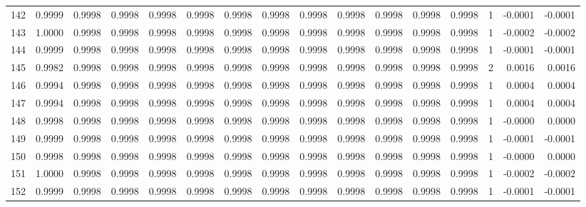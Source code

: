 \begin{tabular}{lrrrrrrrrrrrrrrr}
142 &      0.9999 &  0.9998 &  0.9998 &  0.9998 &  0.9998 &  0.9998 &  0.9998 &  0.9998 &  0.9998 &  0.9998 &   0.9998 &     0.9998 &      1 &                   -0.0001 &                    -0.0001 \\
143 &      1.0000 &  0.9998 &  0.9998 &  0.9998 &  0.9998 &  0.9998 &  0.9998 &  0.9998 &  0.9998 &  0.9998 &   0.9998 &     0.9998 &      1 &                   -0.0002 &                    -0.0002 \\
144 &      0.9999 &  0.9998 &  0.9998 &  0.9998 &  0.9998 &  0.9998 &  0.9998 &  0.9998 &  0.9998 &  0.9998 &   0.9998 &     0.9998 &      1 &                   -0.0001 &                    -0.0001 \\
145 &      0.9982 &  0.9998 &  0.9998 &  0.9998 &  0.9998 &  0.9998 &  0.9998 &  0.9998 &  0.9998 &  0.9998 &   0.9998 &     0.9998 &      2 &                    0.0016 &                     0.0016 \\
146 &      0.9994 &  0.9998 &  0.9998 &  0.9998 &  0.9998 &  0.9998 &  0.9998 &  0.9998 &  0.9998 &  0.9998 &   0.9998 &     0.9998 &      1 &                    0.0004 &                     0.0004 \\
147 &      0.9994 &  0.9998 &  0.9998 &  0.9998 &  0.9998 &  0.9998 &  0.9998 &  0.9998 &  0.9998 &  0.9998 &   0.9998 &     0.9998 &      1 &                    0.0004 &                     0.0004 \\
148 &      0.9998 &  0.9998 &  0.9998 &  0.9998 &  0.9998 &  0.9998 &  0.9998 &  0.9998 &  0.9998 &  0.9998 &   0.9998 &     0.9998 &      1 &                   -0.0000 &                     0.0000 \\
149 &      0.9999 &  0.9998 &  0.9998 &  0.9998 &  0.9998 &  0.9998 &  0.9998 &  0.9998 &  0.9998 &  0.9998 &   0.9998 &     0.9998 &      1 &                   -0.0001 &                    -0.0001 \\
150 &      0.9998 &  0.9998 &  0.9998 &  0.9998 &  0.9998 &  0.9998 &  0.9998 &  0.9998 &  0.9998 &  0.9998 &   0.9998 &     0.9998 &      1 &                   -0.0000 &                     0.0000 \\
151 &      1.0000 &  0.9998 &  0.9998 &  0.9998 &  0.9998 &  0.9998 &  0.9998 &  0.9998 &  0.9998 &  0.9998 &   0.9998 &     0.9998 &      1 &                   -0.0002 &                    -0.0002 \\
152 &      0.9999 &  0.9998 &  0.9998 &  0.9998 &  0.9998 &  0.9998 &  0.9998 &  0.9998 &  0.9998 &  0.9998 &   0.9998 &     0.9998 &      1 &                   -0.0001 &                    -0.0001 \\

\end{tabular}
